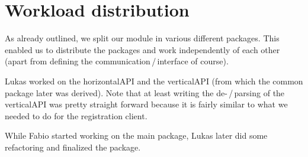 \documentclass[a4paper,english,10pt,NET]{tumarticle}
\begin{document}
\section{Workload distribution}
As already outlined, we split our module in various different packages.
This enabled us to distribute the packages and work independently of each other (apart from defining the communication\,/\,interface of course).


Lukas worked on the horizontalAPI and the verticalAPI (from which the common package later was derived).
Note that at least writing the de-\,/\,parsing of the verticalAPI was pretty straight forward because it is fairly similar to what we needed to do for the registration client.

While Fabio started working on the main package, Lukas later did some refactoring and finalized the package.


\todos
\end{document}
